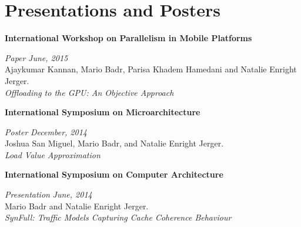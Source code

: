 \section{\sc Presentations and Posters}

{\bf International Workshop on Parallelism in Mobile Platforms}
\vspace{-.3cm}

{\em Paper} \hfill {\em June, 2015}\\
Ajaykumar Kannan, Mario Badr, Parisa Khadem Hamedani and Natalie Enright Jerger.\\
\textit{Offloading to the GPU: An Objective Approach}


{\bf International Symposium on Microarchitecture}
\vspace{-.3cm}

{\em Poster} \hfill {\em December, 2014}\\
Joshua San Miguel, Mario Badr, and Natalie Enright Jerger.\\
\textit{Load Value Approximation}

{\bf International Symposium on Computer Architecture}
\vspace{-.3cm}

{\em Presentation} \hfill {\em June, 2014}\\
Mario Badr and Natalie Enright Jerger.\\
\textit{SynFull: Traffic Models Capturing Cache Coherence Behaviour}




